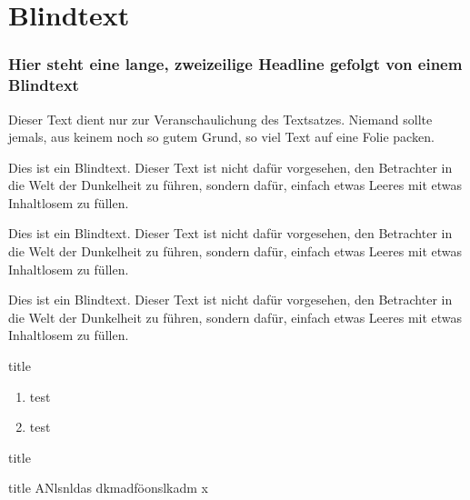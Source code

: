 \documentclass[aspectratio=1610, professionalfonts, 9pt]{beamer}
\begin{document}
\section{Blindtext}
\begin{frame}
  \frametitle{Hier steht eine lange, zweizeilige Headline
  \newline gefolgt von einem Blindtext}
  Dieser Text dient nur zur Veranschaulichung des Textsatzes. Niemand sollte jemals, aus keinem noch so gutem Grund, so viel Text auf eine Folie packen.

  Dies ist ein Blindtext. Dieser Text ist nicht dafür vorgesehen, den Betrachter in die Welt der Dunkelheit zu führen, sondern dafür, einfach etwas Leeres mit etwas Inhaltlosem zu füllen.

  Dies ist ein Blindtext. Dieser Text ist nicht dafür vorgesehen, den Betrachter in die Welt der Dunkelheit zu führen, sondern dafür, einfach etwas Leeres mit etwas Inhaltlosem zu füllen.

  Dies ist ein Blindtext. Dieser Text ist nicht dafür vorgesehen, den Betrachter in die Welt der Dunkelheit zu führen, sondern dafür, einfach etwas Leeres mit etwas Inhaltlosem zu füllen.
\end{frame}

\begin{frame}{title}
  \begin{enumerate}
	\item test
	\item test
  \end{enumerate}
\end{frame}

\begin{frame}{title}
  \begin{block}{title}
	ANlsnldas dkmadföonslkadm x
  \end{block}
\end{frame}
\end{document}
